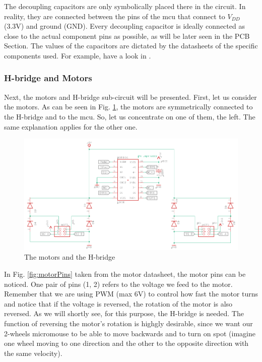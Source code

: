 The decoupling capacitors are only symbolically placed there in the circuit. In reality, they are connected between the pins of the mcu that connect to $V_{DD}$ (3.3V) and ground (GND). Every decoupling capacitor is ideally connected as close to the actual component pins as possible, as will be later seen in the PCB Section. The values of the capacitors are dictated by the datasheets of the specific components used. For example, have a look in \cite{mcu}.

\vspace{1cm}


\subsubsection{H-bridge and Motors}

Next, the motors and H-bridge sub-circuit will be presented. 
First, let us consider the motors. As can be seen in Fig. \ref{fig:motors}, the motors are symmetrically connected to the H-bridge and to the mcu. So, let us concentrate on one of them, the left. The same explanation applies for the other one.

\begin{figure}[htb]
    \centering
    \includegraphics[width=1\textwidth]{figures/hardware/Motors.PNG}
    \caption{The motors and the H-bridge}
    \label{fig:motors}
\end{figure}

\FloatBarrier

In Fig. \ref{fig:motorPins} taken from the motor datasheet, the motor pins can be noticed. 
One pair of pins (1, 2) refers to the voltage we feed to the motor. Remember that we are using PWM (max 6V) to control how fast the motor turns and notice that if the voltage is reversed, the rotation of the motor is also reversed. As we will shortly see, for this purpose, the H-bridge is needed. The function of reversing the motor's rotation is highgly desirable, since we want our 2-wheels micromouse to be able to move backwards and to turn on spot (imagine one wheel moving to one direction and the other to the opposite direction with the same velocity).

